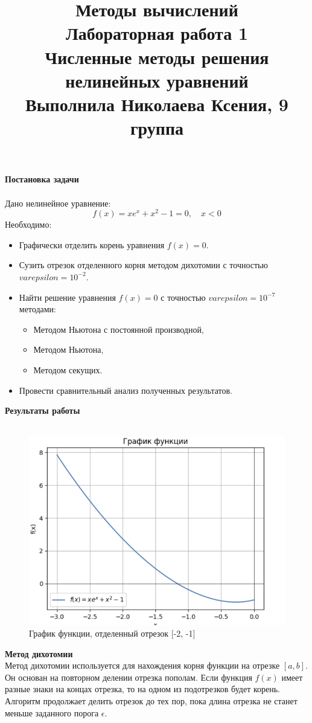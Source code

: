 \documentclass[a4paper, 12pt]{report}
\title{\textbf{\Huge{Методы вычислений}}\\Лабораторная работа 1\\Численные методы решения нелинейных уравнений\\Выполнила Николаева Ксения, 9 группа}
\date{}
\begin{document}
    \maketitle

    \textbf{\Huge{Постановка задачи}}\\\\
Дано нелинейное уравнение:
\[
    f(x) = x e^x + x^2 - 1 = 0, \quad x < 0
\]
Необходимо:
\begin{itemize}
    \item Графически отделить корень уравнения $f(x) = 0$.
    \item Сузить отрезок отделенного корня методом дихотомии с точностью $varepsilon = 10^{-2}$.
    \item Найти решение уравнения $f(x) = 0$ с точностью $varepsilon = 10^{-7}$ методами:
    \begin{itemize}
        \item Методом Ньютона с постоянной производной,
        \item Методом Ньютона,
        \item Методом секущих.
    \end{itemize}
    \item Провести сравнительный анализ полученных результатов.
\end{itemize}

\newpage
\textbf{\Huge{Результаты работы}}\\\\

\begin{figure}
    \centering
    \includegraphics[width=0.7\linewidth]{image.png}
    \caption{График функции, отделенный отрезок [-2, -1]}
    \label{fig:enter-label}
\end{figure}

\textbf{Метод дихотомии}\\
Метод дихотомии используется для нахождения корня функции на отрезке \([a, b]\). Он основан на повторном делении отрезка пополам. Если функция \( f(x) \) имеет разные знаки на концах отрезка, то на одном из подотрезков будет корень. Алгоритм продолжает делить отрезок до тех пор, пока длина отрезка не станет меньше заданного порога \(\epsilon\).
\end{document}
